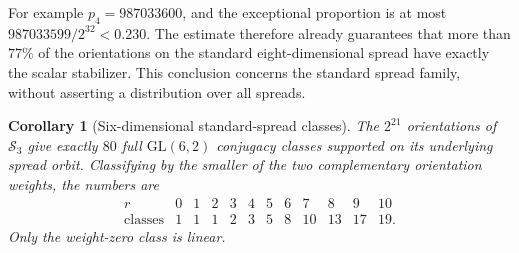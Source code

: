 \documentclass[11pt]{article}
\newtheorem{corollary}[theorem]{Corollary}
\begin{document}
For example $p_4=987033600$, and the exceptional proportion is at most
$987033599/2^{32}<0.230$. The estimate therefore already guarantees that
more than $77\%$ of the orientations on the standard eight-dimensional
spread have exactly the scalar stabilizer. This conclusion concerns the
standard spread family, without asserting a distribution over all spreads.

\begin{corollary}[Six-dimensional standard-spread classes]\label{cor:standard-n6}
The $2^{21}$ orientations of $\mathcal S_3$ give exactly $80$ full
$\mathrm{GL}(6,2)$ conjugacy classes supported on its underlying spread orbit.
Classifying by the smaller of the two complementary orientation weights,
the numbers are
\[
\begin{array}{c|rrrrrrrrrrr}
r&0&1&2&3&4&5&6&7&8&9&10\\ \hline
\text{classes}&1&1&1&2&3&5&8&10&13&17&19.
\end{array}
\]
Only the weight-zero class is linear.
\end{corollary}
\end{document}

